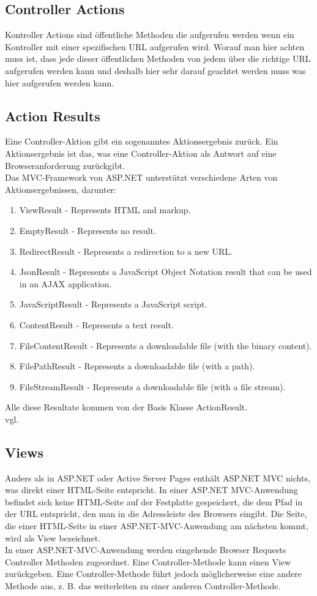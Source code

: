 {\subsection{Controller Actions}
\label{sec:controller_actions}
Kontroller Actions sind öffentliche Methoden die aufgerufen werden wenn ein Kontroller mit einer spezifischen URL aufgerufen wird. Worauf man hier achten muss ist, dass jede dieser öffentlichen Methoden von jedem über die richtige URL aufgerufen werden kann und deshalb hier sehr darauf geachtet werden muss was hier aufgerufen werden kann. 
\subsection{Action Results}
\label{sec:controller_actions_results}
Eine Controller-Aktion gibt ein sogenanntes Aktionsergebnis zurück. Ein Aktionsergebnis ist das, was eine Controller-Aktion als Antwort auf eine Browseranforderung zurückgibt.\\Das MVC-Framework von ASP.NET unterstützt verschiedene Arten von Aktionsergebnissen, darunter:
\begin{enumerate}
\item ViewResult - Represents HTML and markup.
\item EmptyResult - Represents no result.
\item RedirectResult - Represents a redirection to a new URL.
\item JsonResult - Represents a JavaScript Object Notation result that can be used in an AJAX application.
\item JavaScriptResult - Represents a JavaScript script.
\item ContentResult - Represents a text result.
\item FileContentResult - Represents a downloadable file (with the binary content).
\item FilePathResult - Represents a downloadable file (with a path).
\item FileStreamResult - Represents a downloadable file (with a file stream).
\end{enumerate}
Alle diese Resultate kommen von der Basis Klasse ActionResult.
\\ vgl. \textcite{mic_controller}
\subsection{Views}
\label{sec:Views}
Anders als in ASP.NET oder Active Server Pages enthält ASP.NET MVC nichts, was direkt einer HTML-Seite entspricht. In einer ASP.NET MVC-Anwendung befindet sich keine HTML-Seite auf der Festplatte gespeichert, die dem Pfad in der URL entspricht, den man in die Adressleiste des Browsers eingibt. Die Seite, die einer HTML-Seite in einer ASP.NET-MVC-Anwendung am nächsten kommt, wird als View bezeichnet.\\
In einer ASP.NET-MVC-Anwendung werden eingehende Browser Requests Controller Methoden zugeordnet. Eine Controller-Methode kann einen View zurückgeben. Eine Controller-Methode führt jedoch möglicherweise eine andere Methode aus, z. B. das weiterleiten zu einer anderen Controller-Methode.
}
